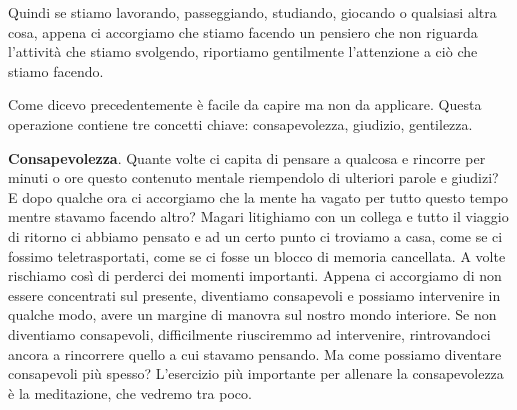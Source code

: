 \documentclass[12pt]{book} %
\begin{document}
Quindi se stiamo lavorando, passeggiando, studiando, giocando o qualsiasi altra cosa, appena ci accorgiamo che stiamo
facendo un pensiero che non riguarda l'attività che stiamo svolgendo, riportiamo gentilmente
l'attenzione a ciò che stiamo facendo. 

Come dicevo precedentemente è facile da capire ma non da applicare. Questa operazione contiene tre concetti chiave:
consapevolezza, giudizio, gentilezza.

\textbf{Consapevolezza}. Quante volte ci capita di pensare a qualcosa e rincorre per minuti o ore questo contenuto mentale
riempendolo di ulteriori parole e giudizi? E dopo qualche ora ci accorgiamo che la mente ha vagato per tutto questo
tempo mentre stavamo facendo altro? Magari litighiamo con un collega e tutto il viaggio di ritorno ci abbiamo pensato e
ad un certo punto ci troviamo a casa, come se ci fossimo teletrasportati, come se ci fosse un blocco di memoria
cancellata. A volte rischiamo così di perderci dei momenti importanti. Appena ci accorgiamo di non essere concentrati
sul presente, diventiamo consapevoli e possiamo intervenire in qualche modo, avere un margine di manovra sul nostro
mondo interiore. Se non diventiamo consapevoli, difficilmente riusciremmo ad intervenire, rintrovandoci ancora a rincorrere quello a cui
stavamo pensando. Ma come possiamo diventare consapevoli più spesso? L'esercizio più importante
per allenare la consapevolezza è la meditazione, che vedremo tra poco.
\end{document}
